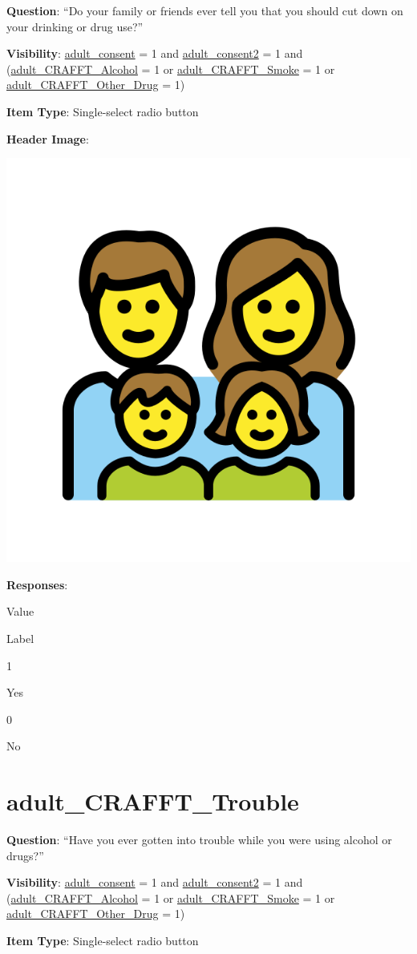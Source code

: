 \documentclass[]{book}
\begin{document}
\textbf{Question}: ``Do your family or friends ever tell you that you should cut down on your drinking or drug use?''

\textbf{Visibility}: \protect\hyperlink{adult_consent}{adult\_consent} = 1 and \protect\hyperlink{adult_consent2}{adult\_consent2} = 1 and (\protect\hyperlink{adult_crafft_alcohol}{adult\_CRAFFT\_Alcohol} = 1 or \protect\hyperlink{adult_crafft_smoke}{adult\_CRAFFT\_Smoke} = 1 or \protect\hyperlink{adult_crafft_other_drug}{adult\_CRAFFT\_Other\_Drug} = 1)

\textbf{Item Type}: Single-select radio button

\textbf{Header Image}:

\begin{flushleft}\includegraphics[width=0.33\linewidth]{downloadFigs4latex_HBN_PMHS_Codebook/adult_CRAFFT_CutDown_headerImg} \end{flushleft}

\textbf{Responses}:

Value

Label

1

Yes

0

No

\hypertarget{adult_crafft_trouble}{%
\section{adult\_CRAFFT\_Trouble}\label{adult_crafft_trouble}}

\textbf{Question}: ``Have you ever gotten into trouble while you were using alcohol or drugs?''

\textbf{Visibility}: \protect\hyperlink{adult_consent}{adult\_consent} = 1 and \protect\hyperlink{adult_consent2}{adult\_consent2} = 1 and (\protect\hyperlink{adult_crafft_alcohol}{adult\_CRAFFT\_Alcohol} = 1 or \protect\hyperlink{adult_crafft_smoke}{adult\_CRAFFT\_Smoke} = 1 or \protect\hyperlink{adult_crafft_other_drug}{adult\_CRAFFT\_Other\_Drug} = 1)

\textbf{Item Type}: Single-select radio button
\end{document}
